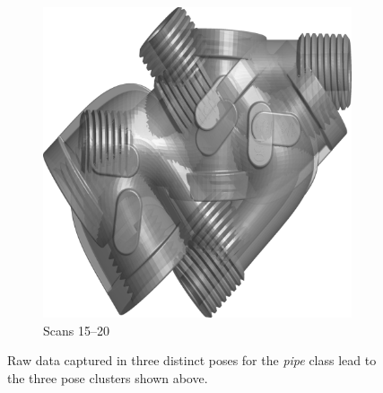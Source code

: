 \begin{figure}[ht]
\begin{subfigure}[b]{0.30\linewidth}
		\includegraphics[width=\linewidth]{fig/reg/cluster3.png}
		\caption{Scans 15--20}
	\end{subfigure}
	\caption{Raw data captured in three distinct poses for the \emph{pipe} class lead to the three pose clusters shown above.}
	\label{fig/reg/3dclusters}
\end{figure}

